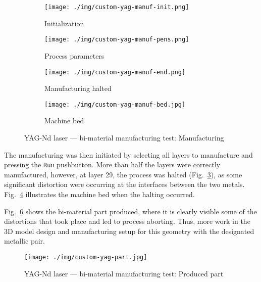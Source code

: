 \begin{figure}[htbp!]
%
  \begin{subfigure}[t]{0.70\textwidth}
    \centering
  \texttt{[image: ./img/custom-yag-manuf-init.png]}
  \caption{Initialization}%
  \label{fig:custom-yag-manuf-init}
\end{subfigure}
%
  \begin{subfigure}[t]{0.28\textwidth}
  \centering
  \texttt{[image: ./img/custom-yag-manuf-pens.png]}
  \caption{Process parameters}%
  \label{fig:custom-yag-manuf-pens}
  \end{subfigure}
%
  \centering
  \begin{subfigure}[t]{0.7\textwidth}
    \texttt{[image: ./img/custom-yag-manuf-end.png]}
  \caption{Manufacturing halted}%
  \label{fig:custom-yag-manuf-end}
  \end{subfigure}
%
  \centering
  \begin{subfigure}[t]{.28\textwidth}
    \texttt{[image: ./img/custom-yag-manuf-bed.jpg]}
  \caption{Machine bed}%
  \label{fig:custom-yag-manuf-bed}
\end{subfigure}
%
  \caption{YAG-Nd laser --- bi-material manufacturing test: Manufacturing}%
  \label{fig:custom-yag-manuf}
\end{figure}

The manufacturing was then initiated by selecting all layers to manufacture and
pressing the \texttt{Run} pushbutton. More than half the layers were correctly
manufactured, however, at layer 29, the process was halted (Fig.~\ref{fig:custom-yag-manuf-end}), as some significant
distortion were occurring at the interfaces between the two
metals. Fig.~\ref{fig:custom-yag-manuf-bed} illustrates the machine bed when the
halting occurred.

Fig.~\ref{fig:custom-yag-produced-part} shows the bi-material part produced,
where it is clearly visible some of the distortions that took place and led to
process aborting. Thus, more work in the 3D model design and manufacturing setup
for this geometry with the designated metallic pair.
%
\begin{figure}[hbtp!]
  \centering
    \texttt{[image: ./img/custom-yag-part.jpg]}
%
  \caption{YAG-Nd laser --- bi-material manufacturing test:
    Produced part}%
  \label{fig:custom-yag-produced-part}
\end{figure}

